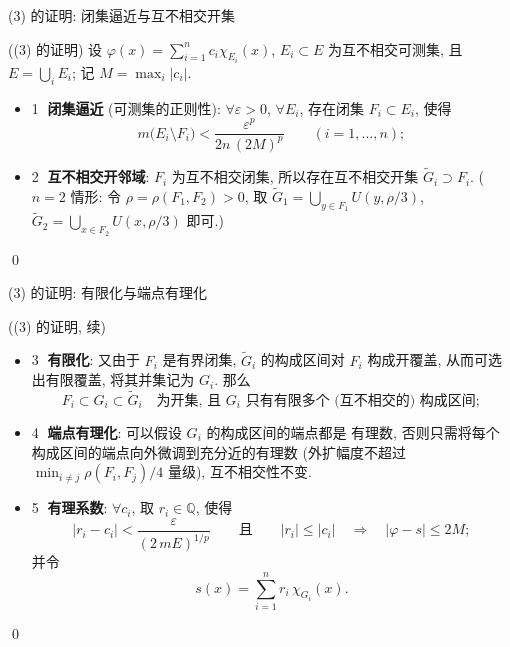 
\begin{frame}{(3) 的证明: 闭集逼近与互不相交开集}

\startproof[bg=yellow, fg=red]((3) 的证明)
设 $\varphi(x) = \sum_{i=1}^{n} c_i \chi_{E_i}(x)$,
$E_i \subset E$ 为互不相交可测集, 且 $E = \bigcup_i E_i$;
记 $M = \max_i |c_i|$.

\pause
\begin{itemize}
\item \textcircled{1} \textbf{闭集逼近} (可测集的正则性): $\forall \varepsilon > 0$,
  $\forall E_i$, 存在闭集 $F_i \subset E_i$, 使得
\[
m \big( E_i \setminus F_i \big) < \frac{\varepsilon^p}{2 n \, (2M)^p}
\qquad (i = 1, \dots, n);
\]
\item \textcircled{2} \textbf{互不相交开邻域}: $F_i$ 为互不相交闭集,
  所以存在互不相交开集 $\widetilde{G}_i \supset F_i$.
  ($n=2$ 情形: 令 $\rho = \rho(F_1, F_2) > 0$,
  取 $\widetilde{G}_1 = \bigcup_{y \in F_1} U(y, \rho/3)$,
  $\widetilde{G}_2 = \bigcup_{x \in F_2} U(x, \rho/3)$ 即可.)
\end{itemize}
\qed

\end{frame}


\begin{frame}{(3) 的证明: 有限化与端点有理化}

\startproof[bg=yellow, fg=red]((3) 的证明, 续)
\begin{itemize}
\item \textcircled{3} \textbf{有限化}: 又由于 $F_i$ 是有界闭集,
  $\widetilde{G}_i$ 的构成区间对 $F_i$ 构成开覆盖, 从而可选出有限覆盖,
  将其并集记为 $G_i$. 那么
  \[
  F_i \subset G_i \subset \widetilde{G}_i
  \quad \text{为开集, 且 } G_i \text{ 只有有限多个 (互不相交的) 构成区间};
  \]
\item \textcircled{4} \textbf{端点有理化}: 可以假设 $G_i$ 的构成区间的端点都是
  有理数, 否则只需将每个构成区间的端点向外微调到充分近的有理数
  (外扩幅度不超过 $\min_{i \neq j} \rho(F_i, F_j) / 4$ 量级),
  互不相交性不变.
\end{itemize}

\pause
\begin{itemize}
\item \textcircled{5} \textbf{有理系数}: $\forall c_i$, 取 $r_i \in \mathbb{Q}$, 使得
  \[
  |r_i - c_i| < \frac{\varepsilon}{(2 \, mE)^{1/p}}
  \qquad \text{且} \qquad |r_i| \leqslant |c_i|
  \quad \Longrightarrow \quad
  |\varphi - s| \leqslant 2M ;
  \]
  并令
  \[
  s(x) = \sum_{i=1}^{n} r_i \, \chi_{G_i}(x) .
  \]
\end{itemize}
\qed

\end{frame}

